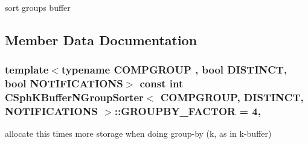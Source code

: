 sort groups buffer 



\subsection{Member Data Documentation}
\hypertarget{classCSphKBufferNGroupSorter_a07f6ccd2070b102cb2fa928cc6a0c46b}{
\subsubsection[{G\-R\-O\-U\-P\-B\-Y\-\_\-\-F\-A\-C\-T\-O\-R}]{\setlength{\rightskip}{0pt plus 5cm}template$<$typename C\-O\-M\-P\-G\-R\-O\-U\-P , bool D\-I\-S\-T\-I\-N\-C\-T, bool N\-O\-T\-I\-F\-I\-C\-A\-T\-I\-O\-N\-S$>$ const {\bf int} {\bf C\-Sph\-K\-Buffer\-N\-Group\-Sorter}$<$ C\-O\-M\-P\-G\-R\-O\-U\-P, D\-I\-S\-T\-I\-N\-C\-T, N\-O\-T\-I\-F\-I\-C\-A\-T\-I\-O\-N\-S $>$\-::G\-R\-O\-U\-P\-B\-Y\-\_\-\-F\-A\-C\-T\-O\-R = 4\hspace{0.3cm}{\ttfamily [static]}, {\ttfamily [protected]}}}\label{classCSphKBufferNGroupSorter_a07f6ccd2070b102cb2fa928cc6a0c46b}


allocate this times more storage when doing group-\/by (k, as in k-\/buffer) 

